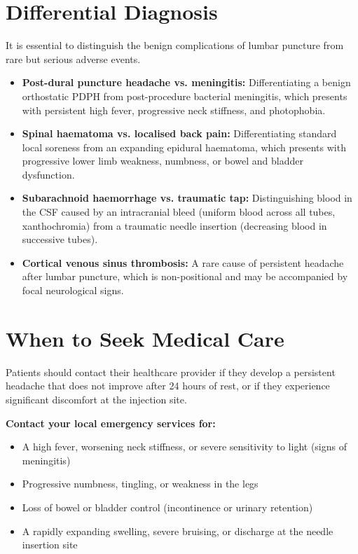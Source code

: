 \section*{Differential Diagnosis}
It is essential to distinguish the benign complications of lumbar puncture from rare but serious adverse events.
\begin{itemize}
    \item \textbf{Post-dural puncture headache vs. meningitis:} Differentiating a benign orthostatic PDPH from post-procedure bacterial meningitis, which presents with persistent high fever, progressive neck stiffness, and photophobia.
    \item \textbf{Spinal haematoma vs. localised back pain:} Differentiating standard local soreness from an expanding epidural haematoma, which presents with progressive lower limb weakness, numbness, or bowel and bladder dysfunction.
    \item \textbf{Subarachnoid haemorrhage vs. traumatic tap:} Distinguishing blood in the CSF caused by an intracranial bleed (uniform blood across all tubes, xanthochromia) from a traumatic needle insertion (decreasing blood in successive tubes).
    \item \textbf{Cortical venous sinus thrombosis:} A rare cause of persistent headache after lumbar puncture, which is non-positional and may be accompanied by focal neurological signs.
\end{itemize}

\section*{When to Seek Medical Care}
Patients should contact their healthcare provider if they develop a persistent headache that does not improve after 24 hours of rest, or if they experience significant discomfort at the injection site.

\textbf{Contact your local emergency services for:}
\begin{itemize}
    \item A high fever, worsening neck stiffness, or severe sensitivity to light (signs of meningitis)
    \item Progressive numbness, tingling, or weakness in the legs
    \item Loss of bowel or bladder control (incontinence or urinary retention)
    \item A rapidly expanding swelling, severe bruising, or discharge at the needle insertion site
\end{itemize}

